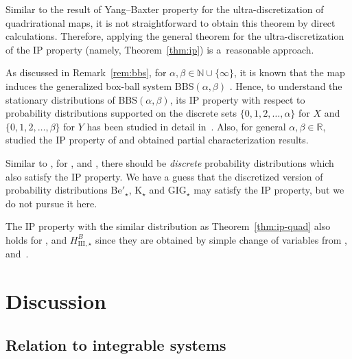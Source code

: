\documentclass[pdftex]{sigma}
\numberwithin{equation}{section}
\def\R{\mathbb{R}}
\def\N{{\mathbb{N}}}
\def\a{{\alpha}}
\def\b{{\beta}}
\begin{document}
Similar to the result of Yang--Baxter property for the ultra-discretization of quadrirational maps, it is not straightforward to obtain this theorem by direct calculations.
Therefore, applying the general theorem for the ultra-discretization of the IP property (namely, Theorem~\ref{thm:ip}) is a~reasonable approach.

\begin{Remark}
 As discussed in Remark~\ref{rem:bbs}, for $\a,\b \in \N \cup\{\infty\}$, it is known that the map~\smash{$H^{B,\a,\b}_{\mathrm{III},\star}$} induces the generalized box-ball system BBS$(\a,\b)$ \cite{TM97}. Hence, to understand the stationary distributions of BBS$(\a,\b)$, its IP property with respect to probability distributions supported on the discrete sets $\{0,1,2,\dots, \a \}$ for $X$ and $\{0,1,2,\dots, \b \}$ for $Y$ has been studied in detail in~\cite{CS}. Also, for general $\a,\b \in \R$,~\cite{CSirf} studied the IP property of \smash{$H^{B,\a,\b}_{\mathrm{III},\star}$} and obtained partial characterization results.
\end{Remark}

\begin{Remark}
Similar to \smash{$H^{B,\a,\b}_{\mathrm{III},\star}$}, for \smash{$H^{+,\a,\b}_{\mathrm{I},\star}$}, \smash{$H^{+,\a,\b}_{\mathrm{II},\star}$} and \smash{$H^{A,\a,\b}_{\mathrm{III},\star}$}, there should be {\it discrete} probability distributions which also satisfy the IP property. We have a guess that the discretized version of probability distributions $\mathrm{Be}'_{\star}$, $\mathrm{K}_{\star}$ and $\mathrm{GIG}_{\star}$ may satisfy the IP property, but we do not pursue it here.
\end{Remark}


\begin{Remark}
The IP property with the similar distribution as Theorem~\ref{thm:ip-quad} also holds for ,  and $H^{B}_{\mathrm{III},\star}$ since they are obtained by simple change of variables from ,  and~.
\end{Remark}

\section{Discussion}\label{section4}

\subsection{Relation to integrable systems}
\end{document}
